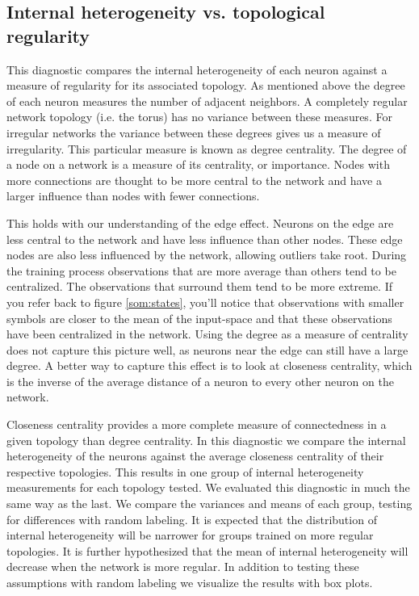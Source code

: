 \subsection{Internal heterogeneity vs. topological regularity}
This diagnostic compares the internal heterogeneity of each neuron against a
measure of regularity for its associated topology.  As mentioned above the
degree of each neuron measures the number of adjacent neighbors.  A completely
regular network topology (i.e. the torus) has no variance between these
measures.  For irregular networks the variance between these degrees gives us
a measure of irregularity. This particular measure is known as degree
centrality.  The degree of a node on a network is a measure of its centrality, or
importance. Nodes with more connections are thought to be more central to the
network and have a larger influence than nodes with fewer connections.

This holds with our understanding of the edge effect.  Neurons on the edge are
less central to the network and have less influence than other nodes.  These
edge nodes are also less influenced by the network, allowing outliers take
root.  During the training process observations that are more average than
others tend to be centralized.  The observations that surround them tend to be
more extreme.  If you refer back to figure \ref{som:states}, you'll notice
that observations with smaller symbols are closer to the mean of the
input-space and that these observations have been centralized in the network.
Using the degree as a measure of centrality does not capture this picture
well, as neurons near the edge can still have a large degree.  A better way to
capture this effect is to look at closeness centrality, which is the
inverse of the average distance of a neuron to every other neuron on the
network.

Closeness centrality provides a more complete measure of connectedness in a
given topology than degree centrality.  In this diagnostic we compare the
internal heterogeneity of the neurons against the average closeness centrality
of their respective topologies.  This results in one group of internal
heterogeneity measurements for each topology tested.  We evaluated this
diagnostic in much the same way as the last.  We compare the variances and
means of each group, testing for differences with random labeling.  It is
expected that the distribution of internal heterogeneity will be narrower for
groups trained on more regular topologies.  It is further hypothesized that
the mean of internal heterogeneity will decrease when the network is more
regular.  In addition to testing these assumptions with random labeling we
visualize the results with box plots.

